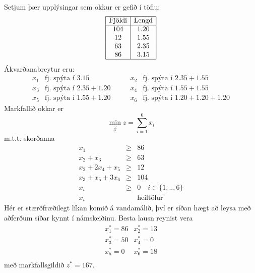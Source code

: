 \begin{lausn}Setjum þær upplýsingar sem okkur er gefið í töflu:
\[ \begin{array}{|c|c|}\hline \mbox{Fjöldi} & \mbox{Lengd} \\ \hline 
  104 & 1.20 \\
  12  & 1.55 \\
  63  & 2.35 \\
  86  & 3.15 \\ \hline 
\end{array}\]
Ákvarðanabreytur eru:
\[\begin{array}{clcl}
  x_1 & \mbox{fj. spýta í }3.15 &
  x_2 & \mbox{fj. spýta í }2.35+1.55 \\
  x_3 & \mbox{fj. spýta í }2.35+1.20 &
  x_4 & \mbox{fj. spýta í }1.55+1.55 \\
  x_5 & \mbox{fj. spýta í }1.55+1.20 \quad\quad&
  x_6 & \mbox{fj. spýta í }1.20+1.20+1.20
\end{array}\]
Markfallið okkar er 
$$ \min_{\vec{x}} z=\sum_{i=1}^6 x_i $$
m.t.t. skorðanna
\begin{eqnarray*}
  x_1 &\geq& 86 \\
  x_2+x_3 &\geq& 63 \\
  x_2+2x_4+x_5 &\geq& 12 \\
  x_3+x_5+3x_6 &\geq& 104 \\
  x_i &\geq& 0 \quad i\in\{1,..,6\}\\
  x_i && \textrm{heiltölur}
\end{eqnarray*}
Hér er stærðfræðilegt líkan komið á vandamálið, því er síðan hægt að leysa með aðferðum síðar kynnt í námskeiðinu. 
Besta lausn reynist vera
\[\begin{array}{ll}
    x_1^* = 86 & x_2^*=13 \\
    x_3^* = 50 & x_4^*= 0 \\
    x_5^* = 0  & x_6^*=18 \\
  \end{array}\]
með markfallsgildið $z^*=167$.


\end{lausn}


